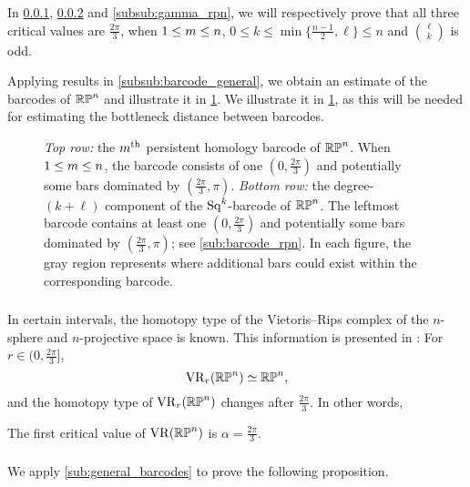 In \cref{subsub:rpn homotopy type}, \cref{subsub:beta_m_rpn} and \cref{subsub:gamma_rpn}, we will respectively prove that all three critical values are $\frac{2\pi}{3}$, when $1 \leq m \leq n$, $0 \leq k \leq \min\{\frac{n-1}{2}, \ell\} \leq n$ and $\binom{\ell}{k}$ is odd.

Applying results in \cref{subsub:barcode_general}, we obtain an estimate of the barcodes of $\mathbb{RP}^n$ and illustrate it in \cref{fig:sq barcodes}.
We illustrate it in \cref{fig:sq barcodes}, as this will be needed for estimating the bottleneck distance between barcodes.

\begin{figure}
	\centering
	
	\caption{\emph{Top row:} the $m^{\mathrm{th}}$ persistent homology barcode of $\mathbb{RP}^n$.
		When $1\leq m \leq n$, the barcode consists of one $(0,\frac{2\pi}{3})$ and potentially some bars dominated by $(\frac{2\pi}{3}, \pi)$.
		\emph{Bottom row:} the degree-$(k+\ell)$ component of the $\operatorname{Sq}^k$-barcode of $\mathbb{RP}^n$.
		The leftmost barcode contains at least one $(0,\frac{2\pi}{3})$ and potentially some bars dominated by $(\frac{2\pi}{3}, \pi)$; see \cref{sub:barcode_rpn}.
        In each figure, the gray region represents where additional bars could exist within the corresponding barcode.
	}
	\label{fig:sq barcodes}
\end{figure}

\subsubsection{}
\label{subsub:rpn homotopy type}

In certain intervals, the homotopy type of the Vietoris--Rips complex of the $n$-sphere and $n$-projective space is known.
This information is presented in \cite[Thm.~4.5]{adams2022metric}:
For $r \in (0,\frac{2\pi}{3} ]$,
\[
\operatorname{VR}_r(\mathbb{RP}^n) \simeq \mathbb{RP}^n,
\]
and the homotopy type of $\operatorname{VR}_r(\mathbb{RP}^n)$ changes after $\tfrac{2\pi}{3}$.
In other words,

\medskip\proposition
The first critical value of \(\operatorname{VR}(\mathbb{RP}^n)\) is \(\alpha = \frac{2\pi}{3}\).

\subsubsection{}
\label{subsub:beta_m_rpn}

We apply \cref{sub:general_barcodes} to prove the following proposition.

